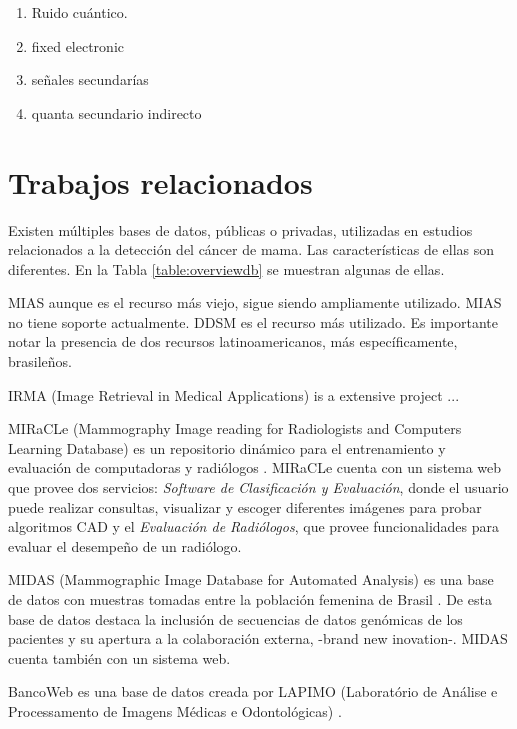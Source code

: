 \begin{enumerate}
    \item Ruido cuántico.
    \item fixed electronic
    \item señales secundarías
    \item quanta secundario indirecto
\end{enumerate}

\section{Trabajos relacionados}

Existen múltiples bases de datos, públicas o privadas, utilizadas en estudios
relacionados a la detección del cáncer de mama. Las características de ellas
son diferentes. En la Tabla \ref{table:overviewdb} se muestran algunas de ellas.

MIAS \cite{sucklingmini} aunque es el recurso más viejo, sigue siendo
ampliamente utilizado. MIAS no tiene soporte actualmente. DDSM
\cite{heath2000digital} es el recurso más utilizado. Es importante notar la
presencia de dos recursos latinoamericanos, más específicamente, brasileños.

IRMA (Image Retrieval in Medical Applications) is a extensive project
\cite{doi:10.1117/12.770325} ...

MIRaCLe (Mammography Image reading for Radiologists and Computers Learning
Database) es un repositorio dinámico para el entrenamiento y evaluación de
computadoras y radiólogos \cite{antoniou2009web}. MIRaCLe cuenta con un sistema
web que provee dos servicios: \textit{Software de Clasificación y Evaluación},
donde el usuario puede realizar consultas, visualizar y escoger diferentes
imágenes para probar algoritmos CAD y el \textit{Evaluación de Radiólogos}, que
provee funcionalidades para evaluar el desempeño de un radiólogo.

MIDAS (Mammographic Image Database for Automated Analysis) es una base de datos
con muestras tomadas entre la población femenina de Brasil
\cite{fernandes2012midas}. De esta base de datos destaca la inclusión de
secuencias de datos genómicas de los pacientes y su apertura a la colaboración
externa, -brand new inovation-. MIDAS cuenta también con un sistema web.

BancoWeb es una base de datos creada por LAPIMO (Laboratório de Análise e
Processamento de Imagens Médicas e Odontológicas) \cite{matheus2011online}.


